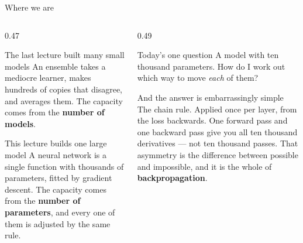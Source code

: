 \documentclass[aspectratio=169]{beamer}
\begin{document}
\begin{frame}[shrink=6]{Where we are}
  \begin{columns}[T]
    \begin{column}{0.47\textwidth}
      \begin{block}{The last lecture built many small models}
        An ensemble takes a mediocre learner, makes hundreds of copies that
        disagree, and averages them. The capacity comes from the
        \textbf{number of models}.
      \end{block}
      \begin{block}{This lecture builds one large model}
        A neural network is a single function with thousands of parameters,
        fitted by gradient descent. The capacity comes from the
        \textbf{number of parameters}, and every one of them is adjusted by
        the same rule.
      \end{block}
    \end{column}
    \begin{column}{0.49\textwidth}
      \begin{exampleblock}{Today's one question}
        A model with ten thousand parameters. How do I work out which way to
        move \emph{each} of them?
      \end{exampleblock}
      \begin{alertblock}{And the answer is embarrassingly simple}
        The chain rule. Applied once per layer, from the loss backwards. One
        forward pass and one backward pass give you all ten thousand
        derivatives --- not ten thousand passes. That asymmetry is the
        difference between possible and impossible, and it is the whole of
        \textbf{backpropagation}.
      \end{alertblock}
    \end{column}
  \end{columns}
\end{frame}
\end{document}
